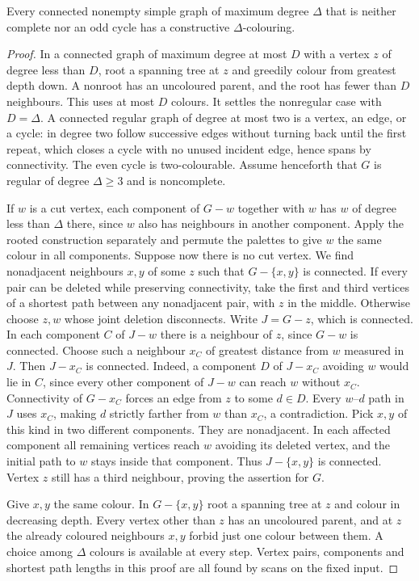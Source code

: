 \begin{theorem}[Brooks]\leavevmode\label{co:brooks}
Every connected nonempty simple graph of maximum degree $\Delta$ that is
neither complete nor an odd cycle has a constructive $\Delta$-colouring.
\end{theorem}
\begin{proof}
In a connected graph of maximum degree at most $D$ with a vertex $z$ of
degree less than $D$, root a spanning tree at $z$ and greedily colour from
greatest depth down. A nonroot has an uncoloured parent, and the root has
fewer than $D$ neighbours. This uses at most $D$ colours. It settles the
nonregular case with $D=\Delta$. A connected regular graph of degree at
most two is a vertex, an edge, or a cycle: in degree two follow successive
edges without turning back until the first repeat, which closes a cycle
with no unused incident edge, hence spans by connectivity. The even cycle
is two-colourable. Assume henceforth that $G$ is regular of degree
$\Delta\ge3$ and is noncomplete.

If $w$ is a cut vertex, each component of $G-w$ together with $w$ has
$w$ of degree less than $\Delta$ there, since $w$ also has neighbours in
another component. Apply the rooted construction separately and permute
the palettes to give $w$ the same colour in all components.
Suppose now there is no cut vertex. We find nonadjacent neighbours $x,y$
of some $z$ such that $G-\{x,y\}$ is connected. If every pair can be
deleted while preserving connectivity, take the first and third vertices
of a shortest path between any nonadjacent pair, with $z$ in
the middle. Otherwise choose $z,w$ whose joint deletion disconnects.
Write $J=G-z$, which is connected. In each component $C$ of $J-w$ there
is a neighbour of $z$, since $G-w$ is connected. Choose such a neighbour
$x_C$ of greatest distance from $w$ measured in $J$. Then $J-x_C$ is
connected. Indeed, a component $D$ of $J-x_C$ avoiding $w$ would lie
in $C$, since every other component of $J-w$ can reach $w$ without
$x_C$. Connectivity of $G-x_C$ forces an edge from $z$ to some $d\in D$.
Every $w$--$d$ path in $J$ uses $x_C$, making $d$ strictly farther from
$w$ than $x_C$, a contradiction. Pick $x,y$ of this kind in two
different components. They are nonadjacent. In each affected component all
remaining vertices reach $w$ avoiding its deleted vertex, and the initial
path to $w$ stays inside that component. Thus $J-\{x,y\}$ is connected.
Vertex $z$ still has a third neighbour, proving the assertion for $G$.

Give $x,y$ the same colour. In $G-\{x,y\}$ root a spanning tree at
$z$ and colour in decreasing depth. Every vertex other than $z$ has an
uncoloured parent, and at $z$ the already coloured neighbours $x,y$
forbid just one colour between them. A choice among $\Delta$ colours
is available at every step. Vertex pairs, components and shortest
path lengths in this proof are all found by scans on the fixed input.
\end{proof}

